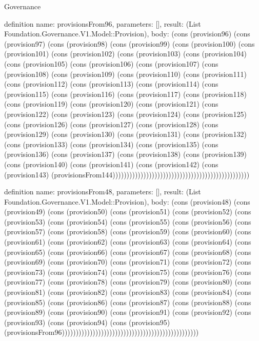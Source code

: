 \begin{lexlean}{Governance}
\begin{semanticmodule}
definition{
  name: provisionsFrom96,
  parameters: [],
  result: (List Foundation.Governance.V1.Model::Provision),
  body: (cons (provision96) (cons (provision97) (cons (provision98) (cons (provision99) (cons (provision100) (cons (provision101) (cons (provision102) (cons (provision103) (cons (provision104) (cons (provision105) (cons (provision106) (cons (provision107) (cons (provision108) (cons (provision109) (cons (provision110) (cons (provision111) (cons (provision112) (cons (provision113) (cons (provision114) (cons (provision115) (cons (provision116) (cons (provision117) (cons (provision118) (cons (provision119) (cons (provision120) (cons (provision121) (cons (provision122) (cons (provision123) (cons (provision124) (cons (provision125) (cons (provision126) (cons (provision127) (cons (provision128) (cons (provision129) (cons (provision130) (cons (provision131) (cons (provision132) (cons (provision133) (cons (provision134) (cons (provision135) (cons (provision136) (cons (provision137) (cons (provision138) (cons (provision139) (cons (provision140) (cons (provision141) (cons (provision142) (cons (provision143) (provisionsFrom144)))))))))))))))))))))))))))))))))))))))))))))))))
}

definition{
  name: provisionsFrom48,
  parameters: [],
  result: (List Foundation.Governance.V1.Model::Provision),
  body: (cons (provision48) (cons (provision49) (cons (provision50) (cons (provision51) (cons (provision52) (cons (provision53) (cons (provision54) (cons (provision55) (cons (provision56) (cons (provision57) (cons (provision58) (cons (provision59) (cons (provision60) (cons (provision61) (cons (provision62) (cons (provision63) (cons (provision64) (cons (provision65) (cons (provision66) (cons (provision67) (cons (provision68) (cons (provision69) (cons (provision70) (cons (provision71) (cons (provision72) (cons (provision73) (cons (provision74) (cons (provision75) (cons (provision76) (cons (provision77) (cons (provision78) (cons (provision79) (cons (provision80) (cons (provision81) (cons (provision82) (cons (provision83) (cons (provision84) (cons (provision85) (cons (provision86) (cons (provision87) (cons (provision88) (cons (provision89) (cons (provision90) (cons (provision91) (cons (provision92) (cons (provision93) (cons (provision94) (cons (provision95) (provisionsFrom96)))))))))))))))))))))))))))))))))))))))))))))))))
}


\end{semanticmodule}
\end{lexlean}
